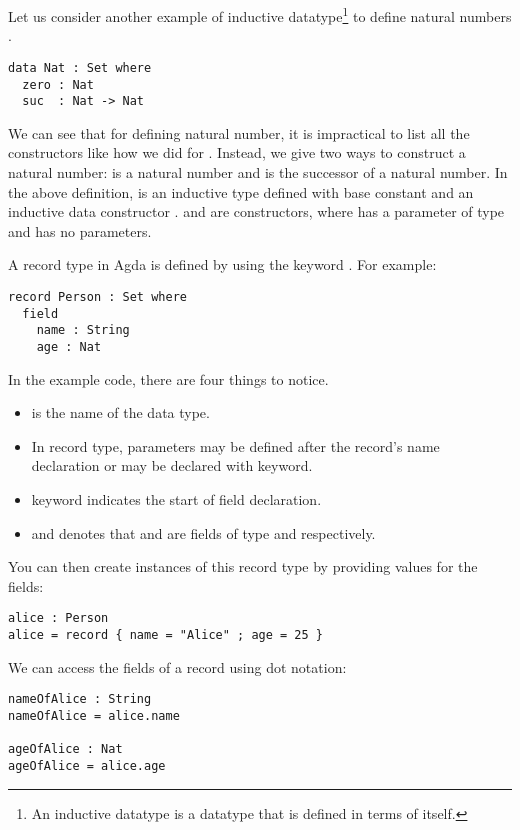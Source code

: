Let us consider another example of inductive datatype\footnote{An inductive
datatype is a datatype that is defined in terms of itself.} to define natural
numbers . 
\label{code:Nat}
\begin{verbatim}
data Nat : Set where
  zero : Nat
  suc  : Nat -> Nat
\end{verbatim}

We can see that for defining natural number, it is impractical to list all the
constructors like how we did for . Instead, we give two ways to
construct a natural number:  is a natural number and 
is the successor of a natural number. In the above definition,  is
an inductive type defined with base constant  and an inductive data
constructor .  and  are constructors, where
 has a parameter of type  and  has no
parameters. 

A record type in Agda is defined by using the keyword . For
example:

\begin{verbatim}
record Person : Set where
  field
    name : String
    age : Nat
\end{verbatim}

In the example code, there are four things to notice.
\begin{itemize}
  \item {} is the name of the data type.
  \item In record type, parameters may be defined after the record's name
  declaration or may be declared with  keyword.
  \item {} keyword indicates the start of field declaration.
  \item {} and  denotes that 
  and  are fields of type  and 
  respectively.
\end{itemize}

You can then create instances of this record type by providing values for the
fields:

\begin{verbatim}
alice : Person
alice = record { name = "Alice" ; age = 25 }
\end{verbatim}

We can access the fields of a record using dot notation:
\begin{verbatim}
nameOfAlice : String
nameOfAlice = alice.name

ageOfAlice : Nat
ageOfAlice = alice.age
\end{verbatim}

